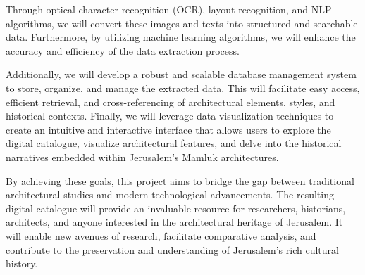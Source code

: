 Through optical character recognition (OCR), layout recognition, and NLP algorithms, we will convert these images and texts into structured and searchable data. Furthermore, by utilizing machine learning algorithms, we will enhance the accuracy and efficiency of the data extraction process.

Additionally, we will develop a robust and scalable database management system to store, organize, and manage the extracted data. This will facilitate easy access, efficient retrieval, and cross-referencing of architectural elements, styles, and historical contexts. Finally, we will leverage data visualization techniques to create an intuitive and interactive interface that allows users to explore the digital catalogue, visualize architectural features, and delve into the historical narratives embedded within Jerusalem's Mamluk architectures.

By achieving these goals, this project aims to bridge the gap between traditional architectural studies and modern technological advancements. The resulting digital catalogue will provide an invaluable resource for researchers, historians, architects, and anyone interested in the architectural heritage of Jerusalem. It will enable new avenues of research, facilitate comparative analysis, and contribute to the preservation and understanding of Jerusalem's rich cultural history.

